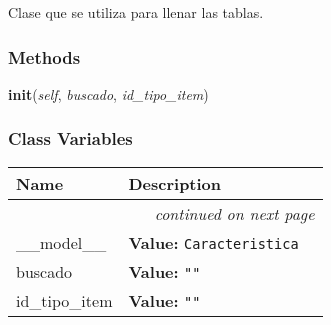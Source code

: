 Clase que se utiliza para llenar las tablas.



  \subsubsection{Methods}

    \label{saip:controllers:caracteristica_controller:CaracteristicaTableFiller:init}

    \vspace{0.5ex}

\hspace{.8\funcindent}\begin{boxedminipage}{\funcwidth}

    \raggedright \textbf{init}(\textit{self}, \textit{buscado}, \textit{id\_tipo\_item})

\setlength{\parskip}{2ex}
\setlength{\parskip}{1ex}
    \end{boxedminipage}



  \subsubsection{Class Variables}

    \vspace{-1cm}
\hspace{\varindent}\begin{longtable}{|p{\varnamewidth}|p{\vardescrwidth}|l}
\cline{1-2}
\cline{1-2} \centering \textbf{Name} & \centering \textbf{Description}& \\
\cline{1-2}
\endhead\cline{1-2}\multicolumn{3}{r}{\small\textit{continued on next page}}\\\endfoot\cline{1-2}
\endlastfoot\raggedright \_\-\_\-m\-o\-d\-e\-l\-\_\-\_\- & \raggedright \textbf{Value:} 
{\tt Caracteristica}&\\
\cline{1-2}
\raggedright b\-u\-s\-c\-a\-d\-o\- & \raggedright \textbf{Value:} 
{\tt ""}&\\
\cline{1-2}
\raggedright i\-d\-\_\-t\-i\-p\-o\-\_\-i\-t\-e\-m\- & \raggedright \textbf{Value:} 
{\tt ""}&\\
\cline{1-2}
\end{longtable}

